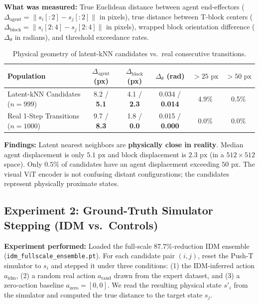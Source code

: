 \documentclass[11pt]{article}
\begin{document}
\textbf{What was measured:} True Euclidean distance between agent end-effectors
($\Delta_{\mathrm{agent}} = \|s_i[:2] - s_j[:2]\|$ in pixels), true distance between T-block centers
($\Delta_{\mathrm{block}} = \|s_i[2:4] - s_j[2:4]\|$ in pixels), wrapped block orientation difference
($\Delta_{\theta}$ in radians), and threshold exceedance rates.

\begin{table}[H]
\centering
\small
\caption{Physical geometry of latent-kNN candidates vs.\ real consecutive transitions.}
\begin{tabular}{@{}lccccc@{}}
\toprule
Population & $\Delta_{\mathrm{agent}}$ (px) & $\Delta_{\mathrm{block}}$ (px) & $\Delta_{\theta}$ (rad) & $>25\text{ px}$ & $>50\text{ px}$ \\
\midrule
Latent-kNN Candidates ($n=999$) & 8.2 / \textbf{5.1} & 4.1 / \textbf{2.3} & 0.034 / \textbf{0.014} & 4.9\% & 0.5\% \\
Real 1-Step Transitions ($n=1000$) & 9.7 / \textbf{8.3} & 1.8 / \textbf{0.0} & 0.015 / \textbf{0.000} & 0.0\% & 0.0\% \\
\bottomrule
\end{tabular}
\label{tab:physical-geometry}
\end{table}

\textbf{Findings:} Latent nearest neighbors are \textbf{physically close in reality}. Median agent displacement
is only $5.1\text{ px}$ and block displacement is $2.3\text{ px}$ (in a $512\times 512$ space). Only $0.5\%$ of
candidates have an agent displacement exceeding $50\text{ px}$. The visual ViT encoder is not confusing distant
configurations; the candidates represent physically proximate states.

\subsection{Experiment 2: Ground-Truth Simulator Stepping (IDM vs.\ Controls)}
\label{sec:exp2-stepping}

\textbf{Experiment performed:} Loaded the full-scale $87.7\%$-reduction IDM ensemble
(\texttt{idm\_fullscale\_ensemble.pt}). For each candidate pair $(i, j)$, reset the Push-T simulator
to $s_i$ and stepped it under three conditions:
(1) the IDM-inferred action $a_{\mathrm{idm}}$,
(2) a random real action $a_{\mathrm{rand}}$ drawn from the expert dataset, and
(3) a zero-action baseline $a_{\mathrm{zero}} = [0, 0]$.
We read the resulting physical state $s'_i$ from the simulator and computed the true distance to the target state $s_j$.
\end{document}

